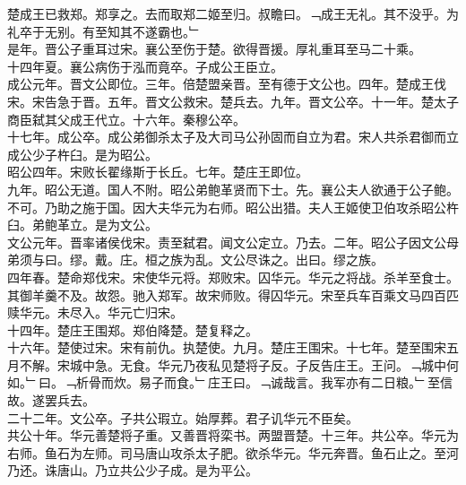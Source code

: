\documentclass{zhvt-classic}
\begin{document}
\hspace*{2em}楚成王已救郑。郑享之。去而取郑二姬至归。叔瞻曰。﹁成王无礼。其不没乎。为礼卒于无别。有至知其不遂霸也。﹂\\
\hspace*{2em}是年。晋公子重耳过宋。襄公至伤于楚。欲得晋援。厚礼重耳至马二十乘。\\
\hspace*{2em}十四年夏。襄公病伤于泓而竟卒。子成公王臣立。\\
\hspace*{2em}成公元年。晋文公即位。三年。倍楚盟亲晋。至有德于文公也。四年。楚成王伐宋。宋告急于晋。五年。晋文公救宋。楚兵去。九年。晋文公卒。十一年。楚太子商臣弑其父成王代立。十六年。秦穆公卒。\\
\hspace*{2em}十七年。成公卒。成公弟御杀太子及大司马公孙固而自立为君。宋人共杀君御而立成公少子杵臼。是为昭公。\\
\hspace*{2em}昭公四年。宋败长翟缘斯于长丘。七年。楚庄王即位。\\
\hspace*{2em}九年。昭公无道。国人不附。昭公弟鲍革贤而下士。先。襄公夫人欲通于公子鲍。不可。乃助之施于国。因大夫华元为右师。昭公出猎。夫人王姬使卫伯攻杀昭公杵臼。弟鲍革立。是为文公。\\
\hspace*{2em}文公元年。晋率诸侯伐宋。责至弑君。闻文公定立。乃去。二年。昭公子因文公母弟须与曰。缪。戴。庄。桓之族为乱。文公尽诛之。出曰。缪之族。\\
\hspace*{2em}四年春。楚命郑伐宋。宋使华元将。郑败宋。囚华元。华元之将战。杀羊至食士。其御羊羹不及。故怨。驰入郑军。故宋师败。得囚华元。宋至兵车百乘文马四百匹赎华元。未尽入。华元亡归宋。\\
\hspace*{2em}十四年。楚庄王围郑。郑伯降楚。楚复释之。\\
\hspace*{2em}十六年。楚使过宋。宋有前仇。执楚使。九月。楚庄王围宋。十七年。楚至围宋五月不解。宋城中急。无食。华元乃夜私见楚将子反。子反告庄王。王问。﹁城中何如。﹂曰。﹁析骨而炊。易子而食。﹂庄王曰。﹁诚哉言。我军亦有二日粮。﹂至信故。遂罢兵去。\\
\hspace*{2em}二十二年。文公卒。子共公瑕立。始厚葬。君子讥华元不臣矣。\\
\hspace*{2em}共公十年。华元善楚将子重。又善晋将栾书。两盟晋楚。十三年。共公卒。华元为右师。鱼石为左师。司马唐山攻杀太子肥。欲杀华元。华元奔晋。鱼石止之。至河乃还。诛唐山。乃立共公少子成。是为平公。\\
\end{document}
